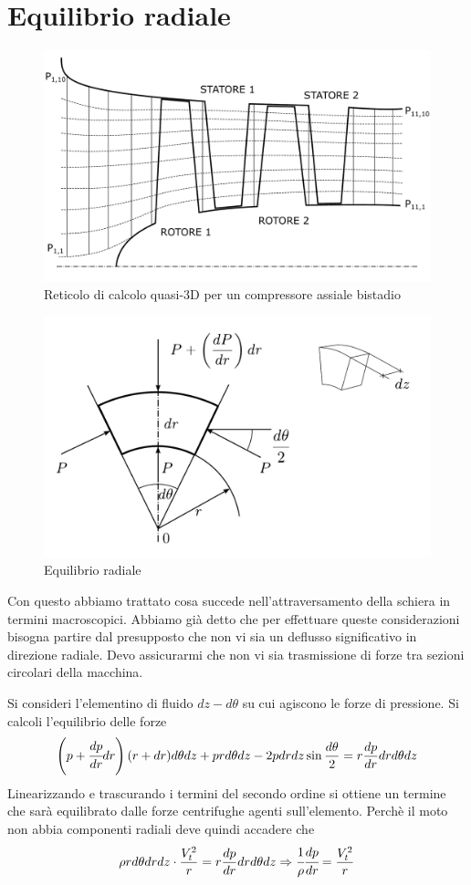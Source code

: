 \section{Equilibrio radiale}
\begin{figure}
\centering
  \includegraphics[width=.8\textwidth]{fig/ReticoloComp.pdf}
\caption{Reticolo di calcolo quasi-3D per un compressore assiale bistadio}
\label{fig:ReticoloComp}
\end{figure}
\begin{figure}
\centering
  \includegraphics[width=.6\textwidth]{fig/concio.pdf}
\caption{Equilibrio radiale}
\label{fig:concio}
\end{figure}
Con questo abbiamo trattato cosa succede nell'attraversamento della schiera in termini macroscopici. Abbiamo già detto che per effettuare queste considerazioni bisogna partire dal presupposto che non vi sia un deflusso significativo in direzione radiale.
Devo assicurarmi che non vi sia trasmissione di forze tra sezioni circolari della macchina.

Si consideri l'elementino di fluido $dz - d\theta$ su cui agiscono le forze di pressione. 
Si calcoli l'equilibrio delle forze
\begin{align*}
\left( p + \cfrac{dp}{dr} dr \right) (r + dr) d \theta dz + pr d \theta dz -2p dr dz \sin \frac{d \theta}{2} = r \frac{dp}{dr} dr d \theta dz
\end{align*}
Linearizzando e trascurando i termini del secondo ordine si ottiene un termine che sarà equilibrato dalle forze centrifughe agenti sull'elemento. Perchè il moto non abbia componenti radiali deve quindi accadere che
\begin{align*}
\rho r d \theta dr dz \cdot \frac{V_t^2}{r} = r \frac{dp}{dr} dr d \theta dz\Rightarrow \cfrac{1}{\rho} \cfrac{dp}{dr} = \frac{V_t^2}{r}
\label{eq:EquilibrioRad}
\end{align*}

